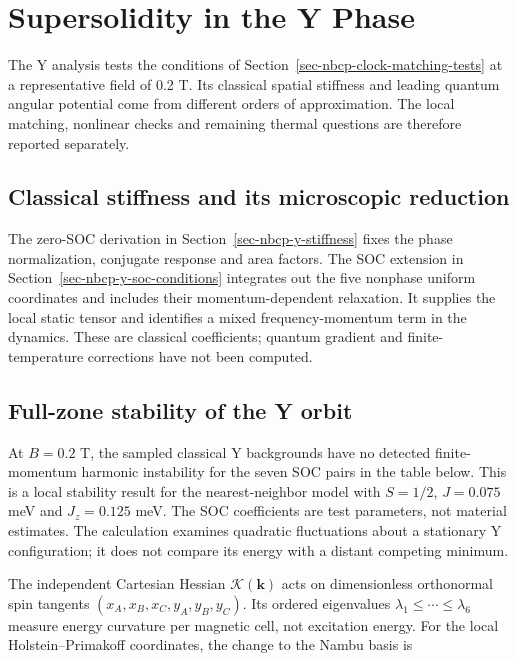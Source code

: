 \clearpage

\section{Supersolidity in the Y Phase}\label{sec-nbcp-y-phase}

The Y analysis tests the conditions of
Section~\ref{sec-nbcp-clock-matching-tests} at a representative field of
0.2 T. Its classical spatial stiffness and leading quantum angular
potential come from different orders of approximation. The local
matching, nonlinear checks and remaining thermal questions are therefore
reported separately.

\subsection{Classical stiffness and its microscopic
reduction}\label{classical-stiffness-and-its-microscopic-reduction}

The zero-SOC derivation in Section~\ref{sec-nbcp-y-stiffness} fixes the
phase normalization, conjugate response and area factors. The SOC
extension in Section~\ref{sec-nbcp-y-soc-conditions} integrates out the
five nonphase uniform coordinates and includes their momentum-dependent
relaxation. It supplies the local static tensor and identifies a mixed
frequency-momentum term in the dynamics. These are classical
coefficients; quantum gradient and finite-temperature corrections have
not been computed.

\subsection{Full-zone stability of the Y
orbit}\label{sec-nbcp-y-full-zone-stability}

At \(B=0.2\) T, the sampled classical Y backgrounds have no detected
finite-momentum harmonic instability for the seven SOC pairs in the
table below. This is a local stability result for the nearest-neighbor
model with \(S=1/2\), \(J=0.075\) meV and \(J_z=0.125\) meV. The SOC
coefficients are test parameters, not material estimates. The
calculation examines quadratic fluctuations about a stationary Y
configuration; it does not compare its energy with a distant competing
minimum.

The independent Cartesian Hessian \(\mathcal K(\mathbf k)\) acts on
dimensionless orthonormal spin tangents \((x_A,x_B,x_C,y_A,y_B,y_C)\).
Its ordered eigenvalues \(\lambda_1\leq\cdots\leq\lambda_6\) measure
energy curvature per magnetic cell, not excitation energy. For the local
Holstein--Primakoff coordinates, the change to the Nambu basis is

